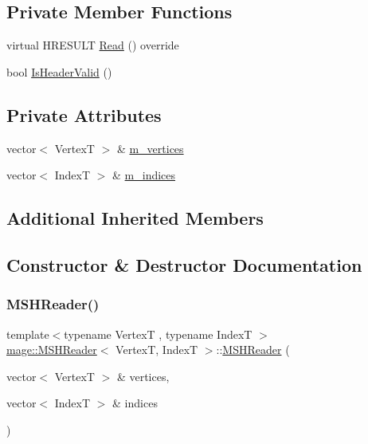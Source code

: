 \subsection*{Private Member Functions}
\begin{DoxyCompactItemize}
\item 
virtual H\+R\+E\+S\+U\+LT \hyperlink{classmage_1_1_m_s_h_reader_abbecacfb2b0d4ec343c79a655c4a7cbe}{Read} () override
\item 
bool \hyperlink{classmage_1_1_m_s_h_reader_a2bc2f2a6410de600c39336f4516a5231}{Is\+Header\+Valid} ()
\end{DoxyCompactItemize}
\subsection*{Private Attributes}
\begin{DoxyCompactItemize}
\item 
vector$<$ VertexT $>$ \& \hyperlink{classmage_1_1_m_s_h_reader_a6b4c0fbf02771cb7bc0ebcb685c3c30b}{m\+\_\+vertices}
\item 
vector$<$ IndexT $>$ \& \hyperlink{classmage_1_1_m_s_h_reader_ae96b703b052eb9951872683e17ab11ae}{m\+\_\+indices}
\end{DoxyCompactItemize}
\subsection*{Additional Inherited Members}


\subsection{Constructor \& Destructor Documentation}
\hypertarget{classmage_1_1_m_s_h_reader_af1254630a9770015c7b62d88eb5251bb}{}\label{classmage_1_1_m_s_h_reader_af1254630a9770015c7b62d88eb5251bb} 
\subsubsection{\texorpdfstring{M\+S\+H\+Reader()}{MSHReader()}\hspace{0.1cm}{\footnotesize\ttfamily [1/3]}}
{\footnotesize\ttfamily template$<$typename VertexT , typename IndexT $>$ \\
\hyperlink{classmage_1_1_m_s_h_reader}{mage\+::\+M\+S\+H\+Reader}$<$ VertexT, IndexT $>$\+::\hyperlink{classmage_1_1_m_s_h_reader}{M\+S\+H\+Reader} (\begin{DoxyParamCaption}\item[{vector$<$ VertexT $>$ \&}]{vertices,  }\item[{vector$<$ IndexT $>$ \&}]{indices }\end{DoxyParamCaption})\hspace{0.3cm}{\ttfamily [explicit]}}

